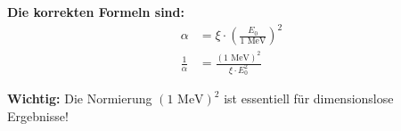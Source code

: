 \documentclass[12pt,a4paper]{article}
\theoremstyle{definition}
\begin{document}
	\begin{tcolorbox}[colback=blue!5!white,colframe=blue!75!black]
		\textbf{Die korrekten Formeln sind:}
		\begin{align*}
			\alpha &= \xi \cdot \left(\frac{E_0}{1 \text{ MeV}}\right)^2 \\
			\frac{1}{\alpha} &= \frac{(1 \text{ MeV})^2}{\xi \cdot E_0^2}
		\end{align*}
	\end{tcolorbox}
	
	\begin{tcolorbox}[colback=red!5!white,colframe=red!75!black]
		\textbf{Wichtig:} Die Normierung $(1 \text{ MeV})^2$ ist essentiell für dimensionslose Ergebnisse!
	\end{tcolorbox}
	
	
\end{document}
